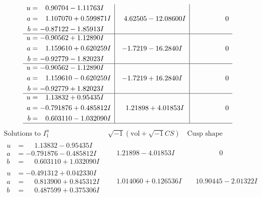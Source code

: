 \documentclass[1p]{elsarticle_modified}
\theoremstyle{definition}
\newcommand{\I}{\sqrt{-1}}
\begin{document}
$$\begin{array}{c|c|c}
\begin{aligned}
u &= \phantom{-}0.90704 - 1.11763 I \\
a &= \phantom{-}1.107070 + 0.599871 I \\
b &= -0.87122 - 1.85913 I\end{aligned}
 & \phantom{-}4.62505 - 12.08600 I & \phantom{-0.000000 } 0 \\ \hline\begin{aligned}
u &= -0.90562 + 1.12890 I \\
a &= \phantom{-}1.159610 + 0.620259 I \\
b &= -0.92779 - 1.82023 I\end{aligned}
 & -1.7219 - 16.2840 I & \phantom{-0.000000 } 0 \\ \hline\begin{aligned}
u &= -0.90562 - 1.12890 I \\
a &= \phantom{-}1.159610 - 0.620259 I \\
b &= -0.92779 + 1.82023 I\end{aligned}
 & -1.7219 + 16.2840 I & \phantom{-0.000000 } 0 \\ \hline\begin{aligned}
u &= \phantom{-}1.13832 + 0.95435 I \\
a &= -0.791876 + 0.485812 I \\
b &= \phantom{-}0.603110 - 1.032090 I\end{aligned}
 & \phantom{-}1.21898 + 4.01853 I & \phantom{-0.000000 } 0\\
 \hline 
 \end{array}$$\newpage$$\begin{array}{c|c|c}  
\text{Solutions to }I^u_{1}& \I (\text{vol} + \sqrt{-1}CS) & \text{Cusp shape}\\
 \hline 
\begin{aligned}
u &= \phantom{-}1.13832 - 0.95435 I \\
a &= -0.791876 - 0.485812 I \\
b &= \phantom{-}0.603110 + 1.032090 I\end{aligned}
 & \phantom{-}1.21898 - 4.01853 I & \phantom{-0.000000 } 0 \\ \hline\begin{aligned}
u &= -0.491312 + 0.042330 I \\
a &= \phantom{-}0.813900 + 0.845312 I \\
b &= \phantom{-}0.487599 + 0.375306 I\end{aligned}
 & \phantom{-}1.014060 + 0.126536 I & \phantom{-}10.90445 - 2.01322 I \\ \hline\begin{aligned}

\end{aligned}
\end{array}$$
\end{document}

